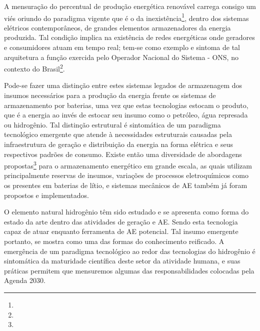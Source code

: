 \documentclass[
  12pt,       %
  openright,      %
  twoside,      %
  a4paper,      %
  english,      %
  french,       %
  spanish,      %
  brazil        %
  ]{abntex2}
\begin{document}
A mensuração do percentual de produção energética renovável carrega consigo um viés oriundo do paradigma vigente que é o da inexistência\footnote{}, dentro dos sistemas elétricos contemporâneos, de grandes elementos armazenadores da energia produzida. Tal condição implica na existência de redes energéticas onde geradores e consumidores atuam em tempo real; tem-se como exemplo e sintoma de tal arquitetura a função exercida pelo Operador Nacional do Sistema - ONS, no contexto do Brasil\footnote{}.

Pode-se fazer uma distinção entre estes sistemas legados de armazenagem dos insumos necessários para a produção da energia frente os sistemas de armazenamento por baterias, uma vez que estas tecnologias estocam o produto, que é a energia ao invés de estocar seu insumo como o petróleo, água represada ou hidrogênio. Tal distinção estrutural é sintomática de um paradigma tecnológico emergente que atende à necessidades estruturais causadas pela infraestrutura de geração e distribuição da energia na forma elétrica e seus respectivos padrões de consumo. Existe então uma diversidade de abordagens propostas\footnote{} para o armazenamento energético em grande escala, as quais utilizam principalmente reservas de insumos, variações de processos eletroquímicos como os presentes em baterias de lítio, e sistemas mecânicos de AE também já foram propostos e implementados.

O elemento natural hidrogênio têm sido estudado e se apresenta como forma do estado da arte dentro das atividades de geração e AE. Sendo esta tecnologia capaz de atuar enquanto ferramenta de AE potencial. Tal insumo emergente portanto, se mostra como uma das formas do conhecimento reificado. A emergência de um paradigma tecnológico ao redor das tecnologias do hidrogênio é sintomática da maturidade científica deste setor da atividade humana, e suas práticas permitem que mensuremos algumas das responsabilidades colocadas pela Agenda 2030. 
\end{document}
